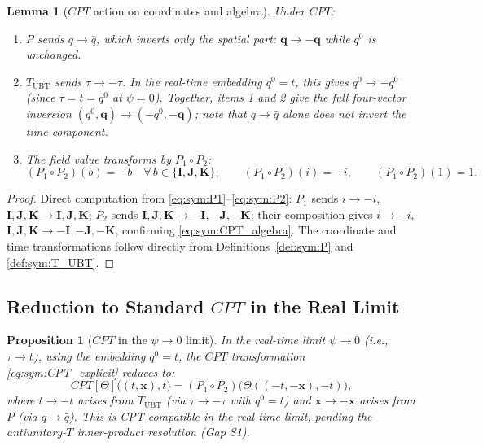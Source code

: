 \documentclass[12pt,a4paper]{article}
\newtheorem{lemma}[theorem]{Lemma}
\newtheorem{proposition}[theorem]{Proposition}
\theoremstyle{definition}
\theoremstyle{remark}
\begin{document}
\begin{lemma}[$CPT$ action on coordinates and algebra]
\label{lem:sym:CPT_action}
Under $CPT$:
\begin{enumerate}
  \item $P$ sends $q \to \bar{q}$, which inverts only the spatial part:
    $\mathbf{q} \to -\mathbf{q}$ while $q^0$ is unchanged.
  \item $T_{\mathrm{UBT}}$ sends $\tau \to -\tau$.
    In the real-time embedding $q^0 = t$, this gives $q^0 \to -q^0$
    (since $\tau = t = q^0$ at $\psi = 0$).
    Together, items 1 and 2 give the full four-vector inversion
    $(q^0, \mathbf{q}) \to (-q^0, -\mathbf{q})$;
    note that $q \to \bar{q}$ alone does \emph{not} invert the time
    component.
  \item The field value transforms by $P_1 \circ P_2$:
    \begin{equation}
      (P_1 \circ P_2)(b) = -b
      \quad \forall\, b \in \{\mathbf{I},\mathbf{J},\mathbf{K}\},
      \qquad
      (P_1 \circ P_2)(i) = -i,
      \qquad
      (P_1 \circ P_2)(1) = 1.
      \label{eq:sym:CPT_algebra}
    \end{equation}
\end{enumerate}
\end{lemma}

\begin{proof}
Direct computation from \eqref{eq:sym:P1}--\eqref{eq:sym:P2}:
$P_1$ sends $i \to -i$, $\mathbf{I},\mathbf{J},\mathbf{K} \to \mathbf{I},\mathbf{J},\mathbf{K}$;
$P_2$ sends $\mathbf{I},\mathbf{J},\mathbf{K} \to -\mathbf{I},-\mathbf{J},-\mathbf{K}$;
their composition gives $i \to -i$, $\mathbf{I},\mathbf{J},\mathbf{K} \to -\mathbf{I},-\mathbf{J},-\mathbf{K}$,
confirming \eqref{eq:sym:CPT_algebra}.
The coordinate and time transformations follow directly from
Definitions~\ref{def:sym:P} and \ref{def:sym:T_UBT}.
\end{proof}

\subsection{Reduction to Standard $CPT$ in the Real Limit}

\begin{proposition}[$CPT$ in the $\psi \to 0$ limit]
\label{prop:sym:CPT_real_limit}
In the real-time limit $\psi \to 0$ (i.e., $\tau \to t$),
using the embedding $q^0 = t$,
the $CPT$ transformation \eqref{eq:sym:CPT_explicit} reduces to:
\begin{equation}
  CPT[\Theta]\bigl((t,\mathbf{x}), t\bigr)
  = (P_1 \circ P_2)\bigl(\Theta((-t,-\mathbf{x}), -t)\bigr),
  \label{eq:sym:CPT_real}
\end{equation}
where $t \to -t$ arises from $T_{\mathrm{UBT}}$ (via $\tau \to -\tau$ with
$q^0 = t$) and $\mathbf{x} \to -\mathbf{x}$ arises from $P$ (via
$q \to \bar{q}$).
This is CPT-compatible in the real-time limit, pending the
antiunitary-$T$ inner-product resolution (Gap S1).
\end{proposition}
\end{document}
